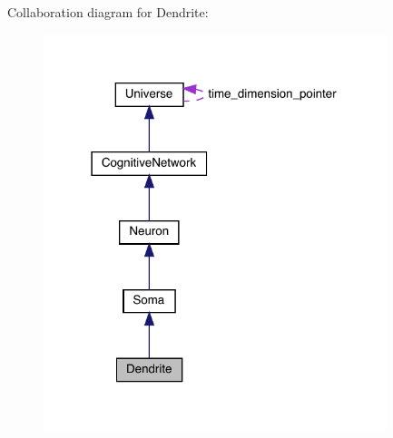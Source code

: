 Collaboration diagram for Dendrite\+:\nopagebreak
\begin{figure}[H]
\begin{center}
\leavevmode
\includegraphics[width=283pt]{class_dendrite__coll__graph}
\end{center}
\end{figure}
